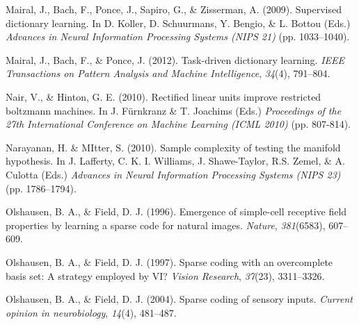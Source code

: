 \documentclass{article} %
\begin{document}
\begin{thebibliography}{100}
Mairal, J., Bach, F., Ponce, J., Sapiro, G., \& Zisserman, A. (2009).
\newblock Supervised dictionary learning.
\newblock In D. Koller, D. Schuurmans, Y. Bengio, \& L. Bottou (Eds.) \emph{Advances in Neural Information Processing Systems (NIPS 21)} (pp. 1033--1040).

Mairal, J., Bach, F., \& Ponce, J. (2012). 
\newblock Task-driven dictionary learning. 
\newblock \emph{IEEE Transactions on Pattern Analysis and Machine Intelligence}, \emph{34}(4), 791--804.


Nair, V., \& Hinton, G. E. (2010). 
\newblock Rectified linear units improve restricted boltzmann machines. 
\newblock In J. F{\"u}rnkranz \& T. Joachims (Eds.) \emph{Proceedings of the 27th International Conference on Machine Learning (ICML 2010)} (pp. 807-814). %

Narayanan, H. \& MItter, S. (2010).
\newblock Sample complexity of testing the manifold hypothesis.
\newblock In J. Lafferty, C. K. I. Williams, J. Shawe-Taylor, R.S. Zemel, \& A. Culotta (Eds.) \emph{Advances in Neural Information Processing Systems (NIPS 23)} (pp. 1786--1794).

Olshausen, B. A., \& Field, D. J. (1996). 
\newblock Emergence of simple-cell receptive field properties by learning a sparse code for natural images. 
\newblock \emph{Nature}, \emph{381}(6583), 607--609.

Olshausen, B. A., \& Field, D. J. (1997). 
\newblock Sparse coding with an overcomplete basis set: A strategy employed by VI?
\newblock \emph{Vision Research}, \emph{37}(23), 3311--3326.

Olshausen, B. A., \& Field, D. J. (2004). 
\newblock Sparse coding of sensory inputs. 
\newblock \emph{Current opinion in neurobiology}, \emph{14}(4), 481--487.


\end{thebibliography}
\end{document}
